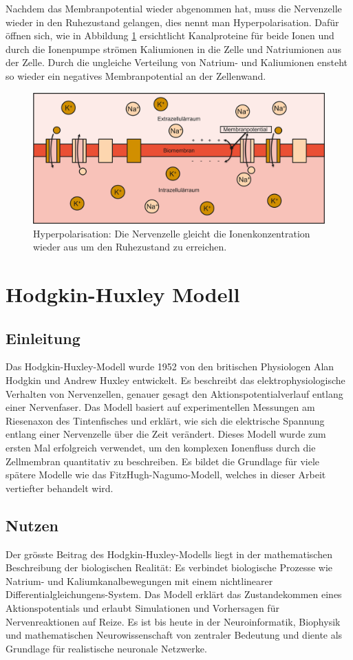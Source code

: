 \begin{refsection}
Nachdem das Membranpotential wieder abgenommen hat, muss die Nervenzelle wieder in den Ruhezustand gelangen, dies nennt
man Hyperpolarisation.
Dafür öffnen sich, wie in Abbildung \ref{fig:Hyperpolarisation} ersichtlicht Kanalproteine für beide Ionen und durch die
Ionenpumpe strömen Kaliumionen in die Zelle und Natriumionen aus der Zelle.
Durch die ungleiche Verteilung von Natrium- und Kaliumionen ensteht so wieder ein negatives Membranpotential an der Zellenwand.
\begin{figure}[h]
    \centering
    \includegraphics[width=\textwidth]{papers/nerven/Bilder/Vorgang5.png}
    \caption{Hyperpolarisation: Die Nervenzelle gleicht die Ionenkonzentration wieder aus um den Ruhezustand zu erreichen.}
    \label{fig:Hyperpolarisation}
\end{figure}

\section{Hodgkin-Huxley Modell}
\subsection{Einleitung}
Das Hodgkin-Huxley-Modell wurde 1952 von den britischen Physiologen Alan Hodgkin und Andrew Huxley entwickelt. Es beschreibt das elektrophysiologische Verhalten von Nervenzellen, genauer gesagt den Aktionspotentialverlauf entlang einer Nervenfaser. Das Modell basiert auf experimentellen Messungen am Riesenaxon des Tintenfisches und erklärt, wie sich die elektrische Spannung entlang einer Nervenzelle über die Zeit verändert. Dieses Modell wurde zum ersten Mal erfolgreich verwendet, um den komplexen Ionenfluss durch die Zellmembran quantitativ zu beschreiben. Es bildet die Grundlage für viele spätere Modelle wie das FitzHugh-Nagumo-Modell, welches in dieser Arbeit vertiefter behandelt wird.
\subsection{Nutzen}
Der grösste Beitrag des Hodgkin-Huxley-Modells liegt in der mathematischen Beschreibung der biologischen Realität: Es verbindet biologische Prozesse wie Natrium- und Kaliumkanalbewegungen mit einem nichtlinearer Differentialgleichungens-System. Das Modell erklärt das Zustandekommen eines Aktionspotentials und erlaubt Simulationen und Vorhersagen für Nervenreaktionen auf Reize. Es ist bis heute in der Neuroinformatik, Biophysik und mathematischen Neurowissenschaft von zentraler Bedeutung und diente als Grundlage für realistische neuronale Netzwerke.

\end{refsection}

